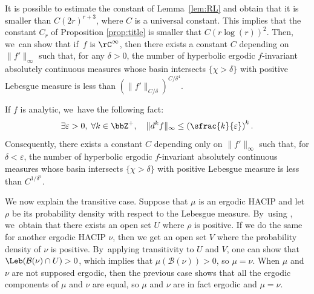 \begin{rmq}
It is possible to estimate the constant of Lemma~\ref{lem:RL} and obtain that it is smaller than $C (2r)^{r+3}$, where $C$ is a universal constant. This implies that the constant $C_r$ of Proposition \ref{prop:title} is smaller that $C (r \log(r))^2$. Then, we~can show that if~$f$ is $\rC^{\infty}$, then there exists a constant $C$ depending on $\| f' \|_{\infty}$ such that, for any $\delta > 0$, the number of hyperbolic ergodic $f$\nobreakdash-invariant absolutely continuous measures whose basin intersects $\{ \chi > \delta \}$ with positive Lebesgue measure is less than
$
\left (\| f' \|_{C/\delta} \right)^{C / \delta^4}
$.
\end{rmq}

\begin{rmq}
\label{rmq:analytic}
If $f$ is analytic, we~have the following fact:
\[
\exists \varepsilon > 0,\; \forall k \in \bbZ^+,\quad \| d^k f\|_{\infty} \leq \left (\sfrac{k}{\varepsilon} \right)^k.
\]
Consequently, there exists a constant $C$ depending only on $\| f' \|_{\infty}$ such that, for $\delta < \varepsilon$, the number of hyperbolic ergodic $f$\nobreakdash-invariant absolutely continuous measures whose basin intersects $\{ \chi > \delta \}$ with positive Lebesgue measure is less than
$
C^{1 / \delta^5}
$.
\end{rmq}

\begin{rmq}
\label{rmq:trans}
We now explain the transitive case. Suppose that $\mu$ is an ergodic HACIP and let $\rho$ be its probability density with respect to the Lebesgue measure. By~using \cite[Lem.\,VII.9.1]{SETE}, we~obtain that there exists an open set $U$ where $\rho$ is positive.
If we do the same for another ergodic HACIP $\nu$, then we get an open set $V$ where the probability density of $\nu$ is positive. By~applying transitivity to $U$ and $V$, one can show that $\Leb(\mathcal{B}(\nu) \cap U) > 0$, which implies that $\mu(\mathcal{B}(\nu)) > 0$, so $\mu=\nu$.
When $\mu$ and $\nu$ are not supposed ergodic, then the previous case shows that all the ergodic components of $\mu$ and $\nu$ are equal, so $\mu$ and $\nu$ are in fact ergodic and $\mu=\nu$.
\end{rmq}
